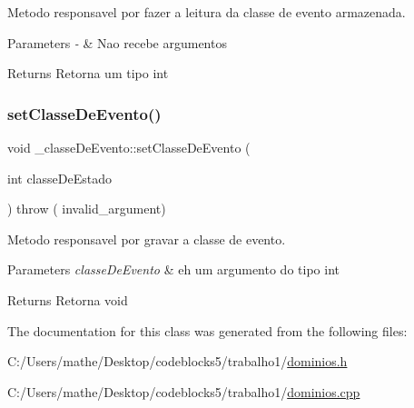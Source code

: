 Metodo responsavel por fazer a leitura da classe de evento armazenada. 


\begin{DoxyParams}{Parameters}
{\em -\/} & Nao recebe argumentos \\
\hline
\end{DoxyParams}
\begin{DoxyReturn}{Returns}
Retorna um tipo int 
\end{DoxyReturn}
\mbox{\label{class__classe_de_evento_aefe318e835e46b4a2c05c12563667f04}} 
\subsubsection{\texorpdfstring{setClasseDeEvento()}{setClasseDeEvento()}}
{\footnotesize\ttfamily void \+\_\+classe\+De\+Evento\+::set\+Classe\+De\+Evento (\begin{DoxyParamCaption}\item[{int}]{classe\+De\+Estado }\end{DoxyParamCaption}) throw ( invalid\+\_\+argument) }



Metodo responsavel por gravar a classe de evento. 


\begin{DoxyParams}{Parameters}
{\em classe\+De\+Evento} & eh um argumento do tipo int \\
\hline
\end{DoxyParams}
\begin{DoxyReturn}{Returns}
Retorna void 
\end{DoxyReturn}


The documentation for this class was generated from the following files\+:\begin{DoxyCompactItemize}
\item 
C\+:/\+Users/mathe/\+Desktop/codeblocks5/trabalho1/\mbox{\hyperlink{dominios_8h}{dominios.\+h}}\item 
C\+:/\+Users/mathe/\+Desktop/codeblocks5/trabalho1/\mbox{\hyperlink{dominios_8cpp}{dominios.\+cpp}}\end{DoxyCompactItemize}
